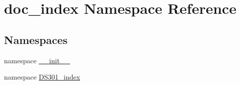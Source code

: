 \hypertarget{namespacedoc__index}{
\section{doc\_\-index Namespace Reference}
\label{namespacedoc__index}
}


\subsection*{Namespaces}
\begin{CompactItemize}
\item 
namespace \hyperlink{namespacedoc__index_1_1____init____}{\_\-\_\-init\_\-\_\-}
\item 
namespace \hyperlink{namespacedoc__index_1_1DS301__index}{DS301\_\-index}
\end{CompactItemize}
